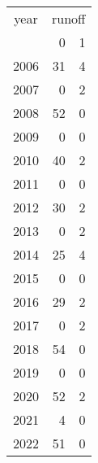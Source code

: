 \footnotesize\begin{tabular}[t]{lrr}
\toprule
\multicolumn{1}{c}{year} & \multicolumn{2}{c}{runoff} \\
\cmidrule(l{3pt}r{3pt}){1-1} \cmidrule(l{3pt}r{3pt}){2-3}
  & 0 & 1\\
\midrule
2006 & 31 & 4\\
2007 & 0 & 2\\
2008 & 52 & 0\\
2009 & 0 & 0\\
2010 & 40 & 2\\
2011 & 0 & 0\\
2012 & 30 & 2\\
2013 & 0 & 2\\
2014 & 25 & 4\\
2015 & 0 & 0\\
2016 & 29 & 2\\
2017 & 0 & 2\\
2018 & 54 & 0\\
2019 & 0 & 0\\
2020 & 52 & 2\\
2021 & 4 & 0\\
2022 & 51 & 0\\
\bottomrule
\end{tabular}
